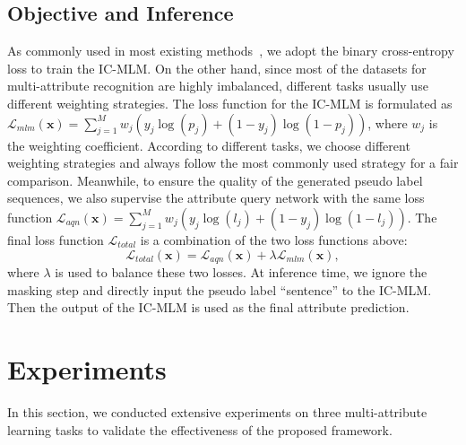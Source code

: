 \documentclass[runningheads]{llncs}
\begin{document}
\subsection{Objective and Inference}
As commonly used in most existing methods~\cite{jia2021spatial,sarafianos2018deep,liu2015deep}, we adopt the binary cross-entropy loss to train the IC-MLM. On the other hand, since most of the datasets for multi-attribute recognition are highly imbalanced, different tasks usually use different weighting strategies. The loss function for the IC-MLM is formulated as $\mathcal{L}_{mlm}(\bm{x}) \!\!=\!\!\sum_{j=1}^{M} \!w_{j}(y_{j} \!\log(p_{j}) \!+\! (1 \!-\! y_{j}) \!\log(1\!-\!p_{j} ))$,
where $w_{j}$ is the weighting coefficient. According to different tasks, we choose different weighting strategies and always follow the most commonly used strategy for a fair comparison. Meanwhile, to ensure the quality of the generated pseudo label sequences, we also supervise the attribute query network with the same loss function $\mathcal{L}_{aqn}(\bm{x}) \!\!=\!\!\sum_{j=1}^{M} \!w_{j}(y_{j} \!\log(l_{j}) \!+\! (1 \!-\! y_{j}) \!\log(1\!-\!l_{j} ))$.
The final loss function $\mathcal{L}_{total}$ is a combination of the two loss functions above:
\begin{equation}
\mathcal{L}_{total}(\bm{x}) = \mathcal{L}_{aqn}(\bm{x}) + \lambda \mathcal{L}_{mlm}(\bm{x}),
\label{equ:allloss}
\end{equation}
where $\lambda$ is used to balance these two losses.
At inference time, we ignore the masking step and directly input the pseudo label ``sentence'' to the IC-MLM. Then the output of the IC-MLM is used as the final attribute prediction.






\section{Experiments}
In this section, we conducted extensive experiments on three multi-attribute learning tasks to validate the effectiveness of the proposed framework.
\end{document}
